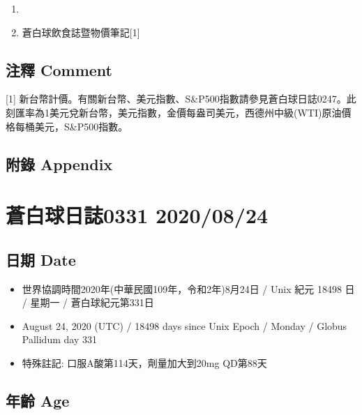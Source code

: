 \documentclass[a5paper, 11pt
]{book}
\providecommand{\tightlist}{%
  \setlength{\itemsep}{0pt}\setlength{\parskip}{0pt}}
\begin{document}
\begin{enumerate}
\def\labelenumi{\arabic{enumi}.}
\tightlist
\item
\item
  蒼白球飲食誌暨物價筆記{[}1{]}
\end{enumerate}

\hypertarget{ux6ce8ux91cb-comment-83}{%
\subsection{注釋 Comment}\label{ux6ce8ux91cb-comment-83}}

{[}1{]}
新台幣計價。有關新台幣、美元指數、S\&P500指數請參見蒼白球日誌0247。此刻匯率為1美元兌新台幣，美元指數，金價每盎司美元，西德州中級(WTI)原油價格每桶美元，S\&P500指數。

\hypertarget{ux9644ux9304-appendix-83}{%
\subsection{附錄 Appendix}\label{ux9644ux9304-appendix-83}}

\hypertarget{ux84bcux767dux7403ux65e5ux8a8c0331-20200824}{%
\section{蒼白球日誌0331
2020/08/24}\label{ux84bcux767dux7403ux65e5ux8a8c0331-20200824}}

\hypertarget{ux65e5ux671f-date-84}{%
\subsection{日期 Date}\label{ux65e5ux671f-date-84}}

\begin{itemize}
\tightlist
\item
  世界協調時間2020年(中華民國109年，令和2年)8月24日 / Unix 紀元 18498 日
  / 星期一 / 蒼白球紀元第331日
\item
  August 24, 2020 (UTC) / 18498 days since Unix Epoch / Monday / Globus
  Pallidum day 331
\item
  特殊註記: 口服A酸第114天，劑量加大到20mg QD第88天
\end{itemize}

\hypertarget{ux5e74ux9f61-age-84}{%
\subsection{年齡 Age}\label{ux5e74ux9f61-age-84}}
\end{document}
